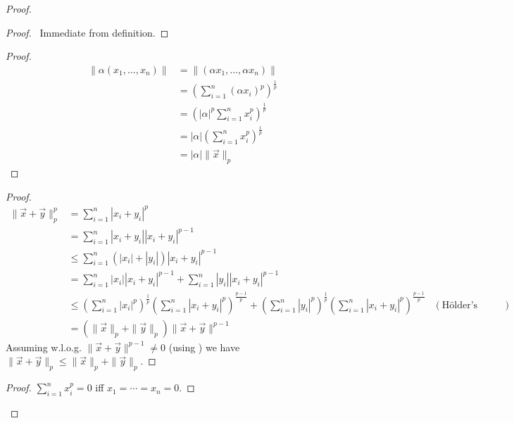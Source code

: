 \documentclass{book}
\let\qed\relax
\theoremstyle{definition}
\begin{document}
\begin{proof}
\pf
{}
\begin{proof}
	\pf\ Immediate from definition.
\end{proof}
\begin{proof}
	\pf
	\begin{align*}
		\| \alpha (x_1, \ldots, x_n) \|
		& = \| (\alpha x_1, \ldots, \alpha x_n) \| \\
		& = \left( \sum_{i=1}^n (\alpha x_i)^p \right)^{\frac{1}{p}} \\
		& = \left( |\alpha|^p \sum_{i=1}^n x_i^p \right)^{\frac{1}{p}} \\
		& = |\alpha| \left( \sum_{i=1}^n x_i^p \right)^{\frac{1}{p}} \\
		& = |\alpha| \|\vec{x}\|_p
	\end{align*}
\end{proof}
\begin{proof}
	\pf
	\begin{align*}
		\| \vec{x} + \vec{y} \|_p^p
		& = \sum_{i=1}^n |x_i + y_i|^p \\
		& = \sum_{i=1}^n |x_i + y_i| |x_i + y_i|^{p-1} \\
		& \leq \sum_{i=1}^n (|x_i| + |y_i|) |x_i + y_i|^{p-1} \\
		& = \sum_{i=1}^n |x_i| |x_i + y_i|^{p-1} + \sum_{i=1}^n |y_i| |x_i + y_i|^{p-1} \\
		& \leq \left( \sum_{i=1}^n |x_i|^p \right)^{\frac{1}{p}} \left( \sum_{i=1}^n |x_i + y_i|^p \right)^{\frac{p-1}{p}} + \left( \sum_{i=1}^n |y_i|^p \right)^{\frac{1}{p}} \left( \sum_{i=1}^n |x_i + y_i|^p \right)^{\frac{p-1}{p}} & (\text{H\"{o}lder's Inequality}) \\
		& = ( \|\vec{x}\|_p + \|\vec{y}\|_p) \| \vec{x} + \vec{y} \|^{p-1}
	\end{align*}
	Assuming w.l.o.g. $\| \vec{x} + \vec{y} \|^{p-1} \neq 0$ (using ) we have $\| \vec{x} + \vec{y} \|_p \leq \| \vec{x} \|_p + \| \vec{y} \|_p$. 	
\end{proof}
\begin{proof}
	\pf $\sum_{i=1}^n x_i^p = 0$ iff $x_1 = \cdots = x_n  = 0$.
\end{proof}
\qed
\end{proof}
\end{document}
